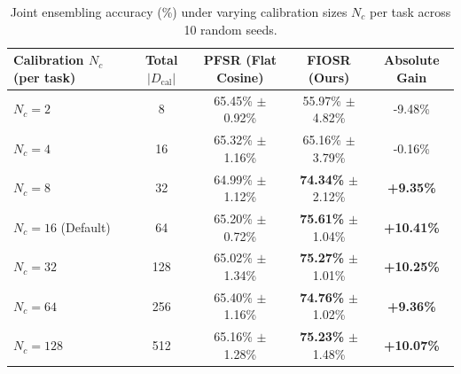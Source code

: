 \begin{table}[h]
\caption{Joint ensembling accuracy (\%) under varying calibration sizes $N_c$ per task across 10 random seeds.}
\label{tab:nc_sensitivity_results}
\begin{center}
\begin{small}
\begin{sc}
\begin{tabular}{lcccc}
\toprule
Calibration $N_c$ (per task) & Total $|D_{\text{cal}}|$ & PFSR (Flat Cosine) & \textbf{FIOSR (Ours)} & Absolute Gain \\
\midrule
$N_c = 2$ & 8 & 65.45\% $\pm$ 0.92\% & 55.97\% $\pm$ 4.82\% & -9.48\% \\
$N_c = 4$ & 16 & 65.32\% $\pm$ 1.16\% & 65.16\% $\pm$ 3.79\% & -0.16\% \\
$N_c = 8$ & 32 & 64.99\% $\pm$ 1.12\% & \textbf{74.34\%} $\pm$ 2.12\% & \textbf{+9.35\%} \\
$N_c = 16$ (Default) & 64 & 65.20\% $\pm$ 0.72\% & \textbf{75.61\%} $\pm$ 1.04\% & \textbf{+10.41\%} \\
$N_c = 32$ & 128 & 65.02\% $\pm$ 1.34\% & \textbf{75.27\%} $\pm$ 1.01\% & \textbf{+10.25\%} \\
$N_c = 64$ & 256 & 65.40\% $\pm$ 1.16\% & \textbf{74.76\%} $\pm$ 1.02\% & \textbf{+9.36\%} \\
$N_c = 128$ & 512 & 65.16\% $\pm$ 1.28\% & \textbf{75.23\%} $\pm$ 1.48\% & \textbf{+10.07\%} \\
\bottomrule
\end{tabular}
\end{sc}
\end{small}
\end{center}
\end{table}

